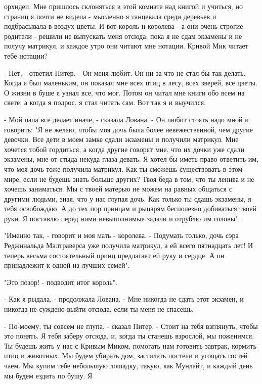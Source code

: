 орхидеи. Мне пришлось склоняться в этой комнате над книгой и учиться, 
но страниц я почти не видела - мысленно я танцевала среди деревьев и 
подбрасывала в воздух цветы. И вот король и королева - а они очень 
строгие родители - решили не выпускать меня отсюда, пока я не сдам 
экзамены и не получу матрикул, и каждое утро они читают мне нотации. 
Кривой Мик читает тебе нотации?
\par- Нет, - ответил Питер. - Он меня любит. Он ни за что не стал бы 
так делать. Когда я был маленьким, он показал мне всех птиц в лесу, 
всех зверей, все цветы. О жизни в буше я узнал все, что мог. Потом он 
читал мне книги обо всем на свете, а когда я подрос, я стал читать 
сам. Вот так я и выучился.
\par- Мой папа все делает иначе, - сказала Лована. - Он любит стоять 
надо мной и говорить: "Я не желаю, чтобы моя дочь была более 
невежественной, чем другие девочки. Все дети в моем замке сдали 
экзамены и получили матрикул. Мне хочется тобой гордиться, а когда 
другие говорят мне, что их дочки уже сдали экзамены, мне от стыда 
некуда глаза девать. Я хотел бы иметь право ответить им, что моя дочь 
тоже получила матрикул. Как ты сможешь существовать в этом мире, если 
не будешь знать больше других? Твоя беда в том, что ты ленива и не 
хочешь заниматься. Мы с твоей матерью не можем на равных общаться с 
другими людьми, зная, что у нас глупая дочь. Как только ты сдашь 
экзамены, я тебя освобождаю. А до тех пор принцам и рыцарям бесполезно 
добиваться твоей руки. Я поставлю перед ними невыполнимые задачи и 
отрублю им головы".
\par"Именно так, - говорит и моя мать - королева. - Подумать только, 
дочь сэра Реджинальда Малтраверса уже получила матрикул, а ей всего 
пятнадцать лет! И теперь весьма состоятельный принц предлагает ей руку 
и сердце. А он принадлежит к одной из лучших семей".
\par"Это позор! - подводит итог король".
\par- Как я рыдала, - продолжала Лована. - Мне никогда не сдать этот 
экзамен, и никогда не суждено выйти отсюда, если ты меня не спасешь.
\par- По-моему, ты совсем не глупа, - сказал Питер. - Стоит на тебя 
взглянуть, чтобы это понять. Я тебя заберу отсюда, и, когда ты станешь 
взрослой, мы поженимся. Ты будешь жить у нас с Кривым Миком, помогать 
нам готовить завтрак, кормить птиц и животных. Мы будем убирать дом, 
застилать постели и угощать гостей чаем. Мы купим тебе небольшую 
лошадку, такую, как Мунлайт, и каждый день мы будем ездить по бушу. Я 
